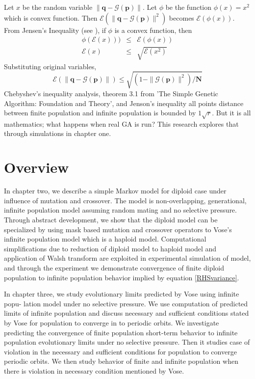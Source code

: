 Let $x$ be the random variable $\| \bm{q} - \mathcal{G}(\bm{p}) \|$. Let $\phi$ be the function $\phi (x) = x^2$ 
which is convex function. Then $\mathcal{E}(\| \bm{q} - \mathcal{G}(\bm{p}) \|^2)$ becomes $\mathcal{E}(\phi (x))$. 
From Jensen's Inequality (see \cite{JensenInequality}),
if $\phi$ is a convex function, then
\begin{eqnarray*}
\phi(\mathcal{E}(x))) & \leq & \mathcal{E}(\phi(x)) \\
\mathcal{E}(x) & \leq & \sqrt{\mathcal{E}(x^2)}
\end{eqnarray*}
Substituting original variables,
\begin{equation}
\label{convergenceRHS}
\mathcal{E}(\| \bm{q} - \mathcal{G}(\bm{p}) \|) \leq \sqrt{(1 - \|\mathcal{G}(\bm{p})\|^2) / \bm{N}}
\end{equation}
Chebyshev's inequality analysis, theorem 3.1 from 'The Simple Genetic Algorithm: Foundation and Theory', and Jenson's inequality all points distance between finite population and infinite population is bounded by $1\sqrt{r}$. But it is all mathematics; what happens when real GA is run? This research explores that through simulations in chapter one.



\section{Overview}
In chapter two, we describe a simple Markov model for diploid case under influence of mutation and crossover. The model is non-overlapping, generational, infinite population model assuming random mating and no selective pressure. Through abstract development, we show that the diploid model can be specialized by using mask based mutation and crossover operators to Vose's infinite population model which is a haploid model. Computational simplifications due to reduction of diploid model to haploid model and application of Walsh transform are exploited in experimental simulation of model, and through the experiment we demonstrate convergence of finite diploid population to infinite population behavior implied by equation \ref{RHSvariance}.

In chapter three, we study evolutionary limits predicted by Vose using infinite popu-
lation model under no selective pressure. We use computation of predicted limits
of infinite population and discuss necessary and sufficient conditions stated by Vose for population
to converge in to periodic orbits. We investigate predicting the convergence of finite population short-term behavior to infinite population evolutionary limits under no selective pressure. Then it studies case of violation in the necessary and sufficient conditions for population to converge periodic orbits. We then study behavior of finite and infinite population when there is violation in necessary condition mentioned by Vose.






